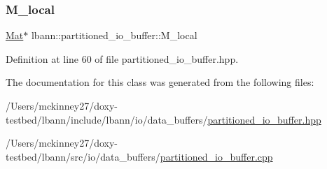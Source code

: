 \subsubsection{\texorpdfstring{M\+\_\+local}{M\_local}}
{\footnotesize\ttfamily \hyperlink{base_8hpp_a68f11fdc31b62516cb310831bbe54d73}{Mat}$\ast$ lbann\+::partitioned\+\_\+io\+\_\+buffer\+::\+M\+\_\+local}



Definition at line 60 of file partitioned\+\_\+io\+\_\+buffer.\+hpp.



The documentation for this class was generated from the following files\+:\begin{DoxyCompactItemize}
\item 
/\+Users/mckinney27/doxy-\/testbed/lbann/include/lbann/io/data\+\_\+buffers/\hyperlink{partitioned__io__buffer_8hpp}{partitioned\+\_\+io\+\_\+buffer.\+hpp}\item 
/\+Users/mckinney27/doxy-\/testbed/lbann/src/io/data\+\_\+buffers/\hyperlink{partitioned__io__buffer_8cpp}{partitioned\+\_\+io\+\_\+buffer.\+cpp}\end{DoxyCompactItemize}
